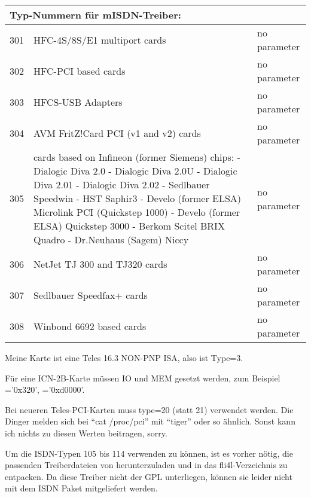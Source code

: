 \begin{description}
\begin{small}
\begin{longtable}{|r|p{60mm}|p{62mm}|}
    \hline\hline
    \multicolumn{3}{|l|}{Typ-Nummern für mISDN-Treiber:} \\
    \hline

    301 & HFC-4S/8S/E1 multiport cards         & no parameter \\
    302 & HFC-PCI based cards                  & no parameter \\
    303 & HFCS-USB Adapters                    & no parameter \\
    304 & AVM FritZ!Card PCI (v1 and v2) cards & no parameter \\
    305 & cards based on Infineon (former Siemens) chips: \newline
          - Dialogic Diva 2.0 \newline
          - Dialogic Diva 2.0U \newline
          - Dialogic Diva 2.01 \newline
          - Dialogic Diva 2.02 \newline
          - Sedlbauer Speedwin \newline
          - HST Saphir3 \newline
          - Develo (former ELSA) Microlink PCI (Quickstep 1000) \newline
          - Develo (former ELSA) Quickstep 3000 \newline
          - Berkom Scitel BRIX Quadro \newline
          - Dr.Neuhaus (Sagem) Niccy           & no parameter \\
    306 & NetJet TJ 300 and TJ320 cards        & no parameter \\
    307 & Sedlbauer Speedfax+ cards            & no parameter \\
    308 & Winbond 6692 based cards             & no parameter \\
    \hline
  \end{longtable}
\end{small}
  
  Meine Karte ist eine Teles 16.3 NON-PNP ISA, also ist Type=3.

  Für eine ICN-2B-Karte müssen IO und MEM gesetzt werden, zum Beispiel
  ='0x320', ='0xd0000'.

  Bei neueren Teles-PCI-Karten muss type=20 (statt 21) verwendet
  werden.  Die Dinger melden sich bei ``cat /proc/pci'' mit ``tiger'' oder
  so ähnlich.  Sonst kann ich nichts zu diesen Werten beitragen,
  sorry.

  Um die ISDN-Typen 105 bis 114 verwenden zu können, ist es vorher nötig, die
  passenden Treiberdateien von 
  herunterzuladen und in das fli4l-Verzeichnis zu entpacken. Da diese Treiber
  nicht der GPL unterliegen, können sie leider nicht mit dem ISDN Paket
  mitgeliefert werden.\\


\end{description}
